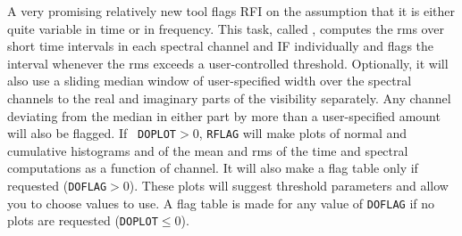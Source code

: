 
A very promising relatively new tool flags RFI on the assumption that
it is either quite variable in time or in frequency.  This task,
called {\tt {}}, computes the rms over short time intervals
in each spectral channel and IF individually and flags the interval
whenever the rms exceeds a user-controlled threshold.  Optionally, it
will also use a sliding median window of user-specified width over the
spectral channels to the real and imaginary parts of the visibility
separately.  Any channel deviating from the median in either part by
more than a user-specified amount will also be flagged.  If {\tt
DOPLOT}$> 0$, {\tt RFLAG} will make plots of normal and cumulative
histograms and of the mean and rms of the time and spectral
computations as a function of channel.  It will also make a flag table
only if requested ({\tt DOFLAG}$ > 0$).  These plots will suggest
threshold parameters and allow you to choose values to use.  A flag
table is made for any value of {\tt DOFLAG} if no plots are requested
({\tt DOPLOT}$\leq 0$).

